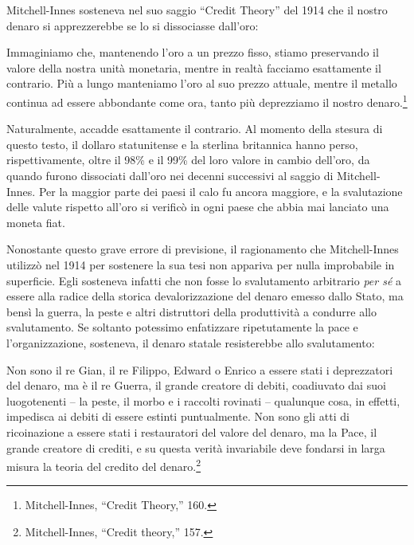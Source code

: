 \documentclass[
  a5paper,
  smalldemyvopaper,10pt,twoside,onecolumn,openright,extrafontsizes,hidelinks]{memoir}
\renewenvironment{quote}%
               {\list{}{\rightmargin=.6cm\leftmargin=.6cm}%
                \itshape \item[]}%
               {\endlist}
\begin{document}
Mitchell-Innes sosteneva nel suo saggio ``Credit Theory'' del 1914 che
il nostro denaro si apprezzerebbe se lo si dissociasse dall'oro:

\begin{quote}
Immaginiamo che, mantenendo l'oro a un prezzo fisso, stiamo preservando
il valore della nostra unità monetaria, mentre in realtà facciamo
esattamente il contrario. Più a lungo manteniamo l'oro al suo prezzo
attuale, mentre il metallo continua ad essere abbondante come ora, tanto
più deprezziamo il nostro denaro.\footnote{Mitchell-Innes, ``Credit
  Theory,'' 160.}
\end{quote}

Naturalmente, accadde esattamente il contrario. Al momento della stesura
di questo testo, il dollaro statunitense e la sterlina britannica hanno
perso, rispettivamente, oltre il 98\% e il 99\% del loro valore in
cambio dell'oro, da quando furono dissociati dall'oro nei decenni
successivi al saggio di Mitchell-Innes. Per la maggior parte dei paesi
il calo fu ancora maggiore, e la svalutazione delle valute rispetto
all'oro si verificò in ogni paese che abbia mai lanciato una moneta
fiat.

Nonostante questo grave errore di previsione, il ragionamento che
Mitchell-Innes utilizzò nel 1914 per sostenere la sua tesi non appariva
per nulla improbabile in superficie. Egli sosteneva infatti che non
fosse lo svalutamento arbitrario \emph{per sé} a essere alla radice
della storica devalorizzazione del denaro emesso dallo Stato, ma bensì
la guerra, la peste e altri distruttori della produttività a condurre
allo svalutamento. Se soltanto potessimo enfatizzare ripetutamente la
pace e l'organizzazione, sosteneva, il denaro statale resisterebbe allo
svalutamento:

\begin{quote}
Non sono il re Gian, il re Filippo, Edward o Enrico a essere stati i
deprezzatori del denaro, ma è il re Guerra, il grande creatore di
debiti, coadiuvato dai suoi luogotenenti -- la peste, il morbo e i
raccolti rovinati -- qualunque cosa, in effetti, impedisca ai debiti di
essere estinti puntualmente. Non sono gli atti di ricoinazione a essere
stati i restauratori del valore del denaro, ma la Pace, il grande
creatore di crediti, e su questa verità invariabile deve fondarsi in
larga misura la teoria del credito del denaro.\footnote{Mitchell-Innes,
  ``Credit theory,'' 157.}
\end{quote}
\end{document}
